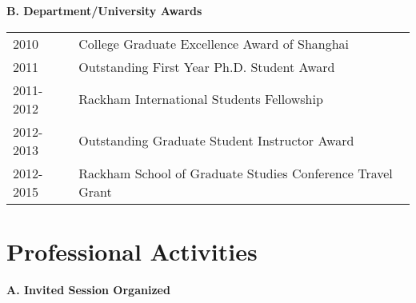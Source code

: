\documentclass[10pt]{article}
\begin{document}
\textbf{B. Department/University Awards}
\begin{table}[H]
\hskip0.9cm\begin{tabular}{p{1.6cm}p{12cm}}
2010 & College Graduate Excellence Award of Shanghai  \\
2011 & Outstanding First Year Ph.D. Student Award \\
2011-2012 & Rackham International Students Fellowship \\
2012-2013 & Outstanding Graduate Student Instructor Award\\
2012-2015 & Rackham School of Graduate Studies Conference Travel Grant
\end{tabular}
\end{table}


\section*{Professional Activities}

%
%

\textbf{A. Invited Session Organized}

\end{document}
